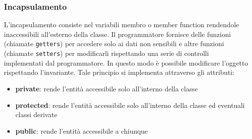 \documentclass[a4paper]{article}
\begin{document}
\subsubsection*{Incapsulamento}
L'incapsulamento consiste nel  variabili membro o member function rendendole inaccessibili all'esterno della
classe. Il programmatore fornisce delle funzioni (chiamate \verb|getters|) per accedere solo ai dati non sensibili e altre
funzioni (chiamate \verb|setters|) per modificarli rispettando una serie di controlli implementati dal programmatore. In questo
modo è possibile modificare l'oggetto rispettando l'invariante. Tale principio si implementa attraverso gli attributi:
\begin{itemize}
	\item \textbf{private}: rende l'entità accessibile solo all'interno della classe
	\item \textbf{protected}: rende l'entità accessibile solo all'interno della classe ed eventuali classi derivate
	\item \textbf{public}: rende l'entità accessibile a chiunque
\end{itemize}
\end{document}
